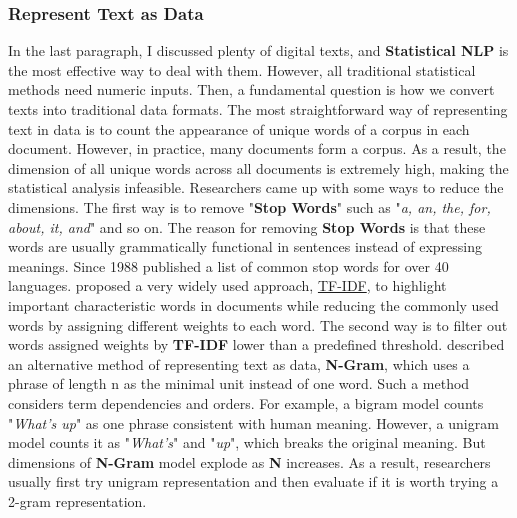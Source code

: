 \documentclass[aoas]{imsart}
\numberwithin{equation}{section}
\theoremstyle{plain}
\theoremstyle{remark}
\begin{document}
\subsubsection{Represent Text as Data}
In the last paragraph, I discussed plenty of digital texts, and \textbf{Statistical NLP} is the most effective way to deal with them. However, all traditional statistical methods need numeric inputs. Then, a fundamental question is how we convert texts into traditional data formats. The most straightforward way of representing text in data is to count the appearance of unique words of a corpus in each document. However, in practice, many documents form a corpus. As a result, the dimension of all unique words across all documents is extremely high, making the statistical analysis infeasible. Researchers came up with some ways to reduce the dimensions. The first way is to remove "\textbf{Stop Words}" such as "\textit{a, an, the, for, about, it, and}" and so on. The reason for removing \textbf{Stop Words} is that these words are usually grammatically functional in sentences instead of expressing meanings. Since 1988 \cite{stop} published a list of common stop words for over 40 languages. \cite{tfidf} proposed a very widely used approach, \href{https://en.wikipedia.org/wiki/Tf%E2%80%93idf}{TF-IDF}, to highlight important characteristic words in documents while reducing the commonly used words by assigning different weights to each word. The second way is to filter out words assigned weights by \textbf{TF-IDF} lower than a predefined threshold. \cite{Hiemstra2009} described an alternative method of representing text as data, \textbf{N-Gram}, which uses a phrase of length n as the minimal unit instead of one word. Such a method considers term dependencies and orders. For example, a bigram model counts "\textit{What's up}" as one phrase consistent with human meaning. However, a unigram model counts it as "\textit{What's}" and "\textit{up}", which breaks the original meaning. But dimensions of \textbf{N-Gram} model explode as \textbf{N} increases. As a result, researchers usually first try unigram representation and then evaluate if it is worth trying a 2-gram representation.
\end{document}
